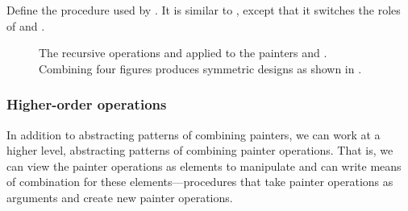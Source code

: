 \begin{exercise}
	\label{Exercise 2.44}
	Define the procedure  used by .
	It is similar to , except that it switches the roles of  and .
\end{exercise}



\begin{figure}[tbp]
	\centering
	
	\caption{
		The recursive operations  and  applied to the painters  and .
		Combining four  figures produces symmetric  designs as shown in .
	}
	\label{Figure 2.14}
\end{figure}



\subsubsection*{Higher-order operations}

In addition to abstracting patterns of combining painters, we can work at a higher level, abstracting patterns of combining painter operations.
That is, we can view the painter operations as elements to manipulate and can write means of combination for these elements---procedures that take painter operations as arguments and create new painter operations.

